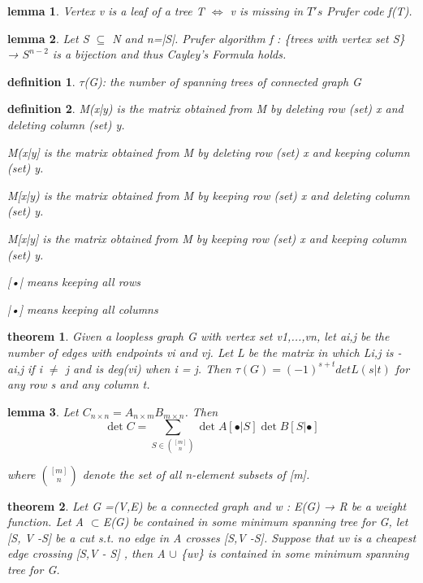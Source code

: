 \documentclass[twocolumn]{article}
\newtheorem{theorem}{theorem}[section]  %
\newtheorem{definition}{definition}
\newtheorem{lemma}{lemma}
\begin{document}
\begin{CJK*}{UTF8}{bkai}
    \begin{lemma}
        Vertex v is a leaf of a tree T $\iff$ v is missing in $T's$ Prufer code f(T).
    \end{lemma}

    \begin{lemma}
        Let S $\subseteq$ N and n=|S|. Prufer algorithm f : \{trees with vertex set S\} → $S^{n-2}$
 is a bijection and thus Cayley's Formula holds.
    \end{lemma}    

    \begin{definition}
         $\tau$(G): the number of spanning trees of connected graph G
    \end{definition}

    \begin{definition}
        M(x|y) is the matrix obtained from M by deleting row (set) x and deleting
 column (set) y.

 M(x|y] is the matrix obtained from M by deleting row (set) x and keeping
 column (set) y.

 M[x|y) is the matrix obtained from M by keeping row (set) x and deleting
 column (set) y.

 M[x|y] is the matrix obtained from M by keeping row (set) x and keeping
 column (set) y.

 [•| means keeping all rows
 
 |•] means keeping all columns
    \end{definition}


    \begin{theorem}
        Given a loopless graph G with vertex set v1,...,vn, let ai,j be the number of
 edges with endpoints vi and vj. Let L be the matrix in which Li,j is -ai,j if
 i $\neq$ j and is deg(vi) when i = j. Then
 $\tau(G) = (-1)^{s+t}detL(s|t)$
 for any row s and any column t.
    \end{theorem}

    \begin{lemma} 
        Let \( C_{n \times n} = A_{n \times m} B_{m \times n} \). Then
        \[
        \det C = \sum_{S \in \binom{[m]}{n}} \det A[\bullet |S] \det B[S| \bullet]
        \]

        where $\binom{[m]}{n}$ denote the set of all n-element subsets of [m].
    \end{lemma}

    \begin{theorem}
        Let G =(V,E) be a connected graph and w : E(G) → R be a weight function.
 Let A $\subset$E(G) be contained in some minimum spanning tree for G, let
 [S, V -S] be a cut s.t. no edge in A crosses [S,V -S]. Suppose that uv is a
 cheapest edge crossing [S,V - S] , then A $\cup$ \{uv\} is contained in some
 minimum spanning tree for G.
    \end{theorem}


\end{CJK*}
\end{document}
